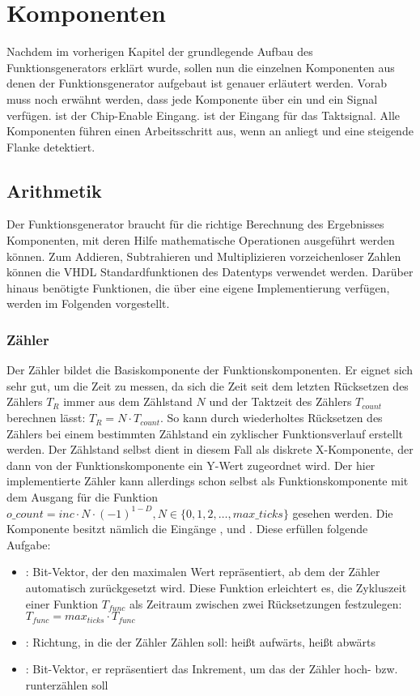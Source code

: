 \chapter{Komponenten}
Nachdem im vorherigen Kapitel der grundlegende Aufbau des Funktionsgenerators erklärt wurde, sollen nun die einzelnen Komponenten aus denen der Funktionsgenerator aufgebaut ist genauer erläutert werden.
Vorab muss noch erwähnt werden, dass jede Komponente über ein  und ein  Signal verfügen.
 ist der Chip-Enable Eingang.  ist der Eingang für das Taktsignal.
Alle Komponenten führen einen Arbeitsschritt aus, wenn an   anliegt und  eine steigende Flanke detektiert.

\section{Arithmetik}
Der Funktionsgenerator braucht für die richtige Berechnung des Ergebnisses Komponenten, mit deren Hilfe mathematische Operationen ausgeführt werden können.
Zum Addieren, Subtrahieren und Multiplizieren vorzeichenloser Zahlen können die VHDL Standardfunktionen des Datentyps  verwendet werden.
Darüber hinaus benötigte Funktionen, die über eine eigene Implementierung verfügen, werden im Folgenden vorgestellt.

\subsection{Zähler} \label{Comp:Arith:Count}
Der Zähler bildet die Basiskomponente der Funktionskomponenten. Er eignet sich sehr gut, um die Zeit zu messen, da sich die Zeit seit dem letzten Rücksetzen des Zählers $T_{R}$ immer aus dem Zählstand $N$ und der Taktzeit des Zählers $T_{count}$ berechnen lässt: $T_{R} = N \cdot T_{count}$. So kann durch wiederholtes Rücksetzen des Zählers bei einem bestimmten Zählstand ein zyklischer Funktionsverlauf erstellt werden.
Der Zählstand selbst dient in diesem Fall als diskrete X-Komponente, der dann von der Funktionskomponente ein Y-Wert zugeordnet wird.
Der hier implementierte Zähler kann allerdings schon selbst als Funktionskomponente mit dem Ausgang  für die Funktion $o\_count = inc \cdot N \cdot (-1) ^ {1 - D}, N \in \{0, 1, 2, \dots, max\_ticks\}$ gesehen werden.
Die Komponente besitzt nämlich die Eingänge ,  und . Diese erfüllen folgende Aufgabe:
\begin{itemize}
\item {}: Bit-Vektor, der den maximalen Wert repräsentiert, ab dem der Zähler automatisch zurückgesetzt wird.
Diese Funktion erleichtert es, die Zykluszeit einer Funktion $T_{func}$ als Zeitraum zwischen zwei Rücksetzungen festzulegen: $T_{func} = max_{ticks} \cdot T_{func}$
\item {}: Richtung, in die der Zähler Zählen soll:  heißt aufwärts,  heißt abwärts
  \item {}: Bit-Vektor, er repräsentiert das Inkrement, um das der Zähler hoch- bzw. runterzählen soll
\end{itemize}

